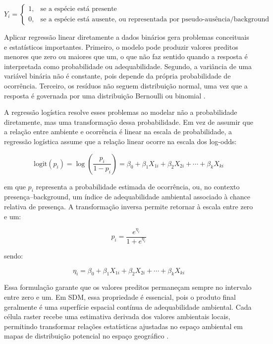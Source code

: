\begin{equation}
	Y_i =
	\begin{cases}
		1, & \text{se a espécie está presente} \\
		0, & \text{se a espécie está ausente, ou representada por pseudo-ausência/background}
	\end{cases}
\end{equation}

Aplicar regressão linear diretamente a dados binários gera problemas conceituais e estatísticos importantes. Primeiro, o modelo pode produzir valores preditos menores que zero ou maiores que um, o que não faz sentido quando a resposta é interpretada como probabilidade ou adequabilidade. Segundo, a variância de uma variável binária não é constante, pois depende da própria probabilidade de ocorrência. Terceiro, os resíduos não seguem distribuição normal, uma vez que a resposta é governada por uma distribuição Bernoulli ou binomial \citep{mccullagh1989generalized,hosmer2013applied,zuur2009mixed}.

A regressão logística resolve esses problemas ao modelar não a probabilidade diretamente, mas uma transformação dessa probabilidade. Em vez de assumir que a relação entre ambiente e ocorrência é linear na escala de probabilidade, a regressão logística assume que a relação linear ocorre na escala dos log-odds:

\begin{equation}
	\text{logit}(p_i) =
	\log\left(\frac{p_i}{1-p_i}\right)
	=
	\beta_0 + \beta_1X_{1i} + \beta_2X_{2i} + \cdots + \beta_kX_{ki}
\end{equation}

\noindent em que $p_i$ representa a probabilidade estimada de ocorrência, ou, no contexto presença--background, um índice de adequabilidade ambiental associado à chance relativa de presença. A transformação inversa permite retornar à escala entre zero e um:

\begin{equation}
	p_i =
	\frac{e^{\eta_i}}{1 + e^{\eta_i}}
\end{equation}

\noindent sendo:

\begin{equation}
	\eta_i =
	\beta_0 + \beta_1X_{1i} + \beta_2X_{2i} + \cdots + \beta_kX_{ki}
\end{equation}

Essa formulação garante que os valores preditos permaneçam sempre no intervalo entre zero e um. Em SDM, essa propriedade é essencial, pois o produto final geralmente é uma superfície espacial contínua de adequabilidade ambiental. Cada célula raster recebe uma estimativa derivada dos valores ambientais locais, permitindo transformar relações estatísticas ajustadas no espaço ambiental em mapas de distribuição potencial no espaço geográfico \citep{franklin2010mapping,guisan2017habitat}.

